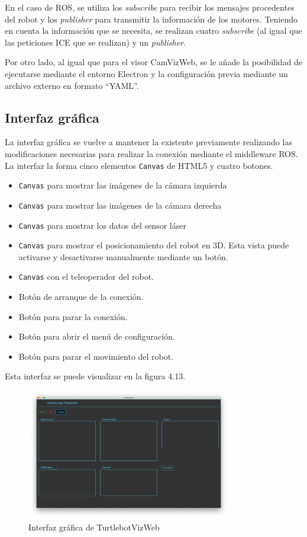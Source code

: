 En el caso de ROS, se utiliza los \textit{subscribe} para recibir los mensajes procedentes del robot y los \textit{publisher} para transmitir la información de los motores. Teniendo en cuenta la información que se necesita, se realizan cuatro \textit{subscribe} (al igual que las peticiones ICE que se realizan) y un \textit{publisher}.

Por otro lado, al igual que para el visor CamVizWeb, se le añade la posibilidad de ejecutarse mediante el entorno Electron y la configuración previa mediante un archivo externo en formato ``YAML''.

\subsection{Interfaz gráfica}
La interfaz gráfica se vuelve a mantener la existente previamente realizando las modificaciones necesarias para realizar la conexión mediante el middleware ROS. La interfaz la forma cinco elementos \texttt{Canvas} de HTML5 y cuatro botones.
\begin{itemize}
\item \texttt{Canvas} para mostrar las imágenes de la cámara izquierda
\item \texttt{Canvas} para mostrar las imágenes de la cámara derecha
\item \texttt{Canvas} para mostrar los datos del sensor láser
\item \texttt{Canvas} para mostrar el posicionamiento del robot en 3D. Esta vista puede activarse y desactivarse manualmente mediante un botón.
\item \texttt{Canvas} con el teleoperador del robot.
\item Botón de arranque de la conexión.
\item Botón para parar la conexión.
\item Botón para abrir el menú de configuración.
\item Botón para parar el movimiento del robot.
\end{itemize}

Esta interfaz se puede visualizar en la figura 4.13.

\begin{figure}[H]
  \begin{center}
    \includegraphics[width=0.8\textwidth]{figures/interfazturtlebotviz.png}
		\caption{Interfaz gráfica de TurtlebotVizWeb}
		\label{fig.iterfazturtlebotviz}
		\end{center}
\end{figure}

